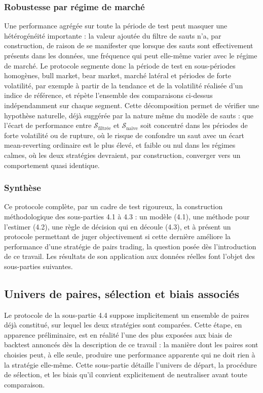 \documentclass{article}
\begin{document}
\subsubsection*{Robustesse par régime de marché}
Une performance agrégée sur toute la période de test peut masquer une hétérogénéité importante : la valeur ajoutée du filtre de sauts n'a, par construction, de raison de se manifester que lorsque des sauts sont effectivement présents dans les données, une fréquence qui peut elle-même varier avec le régime de marché. Le protocole segmente donc la période de test en sous-périodes homogènes, bull market, bear market, marché latéral et périodes de forte volatilité, par exemple à partir de la tendance et de la volatilité réalisée d'un indice de référence, et répète l'ensemble des comparaisons ci-dessus indépendamment sur chaque segment. Cette décomposition permet de vérifier une hypothèse naturelle, déjà suggérée par la nature même du modèle de sauts : que l'écart de performance entre $\mathcal{S}_{\text{filtrée}}$ et $\mathcal{S}_{\text{naïve}}$ soit concentré dans les périodes de forte volatilité ou de rupture, où le risque de confondre un saut avec un écart mean-reverting ordinaire est le plus élevé, et faible ou nul dans les régimes calmes, où les deux stratégies devraient, par construction, converger vers un comportement quasi identique.
\subsubsection*{Synthèse}
Ce protocole complète, par un cadre de test rigoureux, la construction méthodologique des sous-parties 4.1 à 4.3 : un modèle (4.1), une méthode pour l'estimer (4.2), une règle de décision qui en découle (4.3), et à présent un protocole permettant de juger objectivement si cette dernière améliore la performance d'une stratégie de pairs trading, la question posée dès l'introduction de ce travail. Les résultats de son application aux données réelles font l'objet des sous-parties suivantes.
\subsection{Univers de paires, sélection et biais associés}
Le protocole de la sous-partie 4.4 suppose implicitement un ensemble de paires déjà constitué, sur lequel les deux stratégies sont comparées. Cette étape, en apparence préliminaire, est en réalité l'une des plus exposées aux biais de backtest annoncés dès la description de ce travail : la manière dont les paires sont choisies peut, à elle seule, produire une performance apparente qui ne doit rien à la stratégie elle-même. Cette sous-partie détaille l'univers de départ, la procédure de sélection, et les biais qu'il convient explicitement de neutraliser avant toute comparaison.
\end{document}
